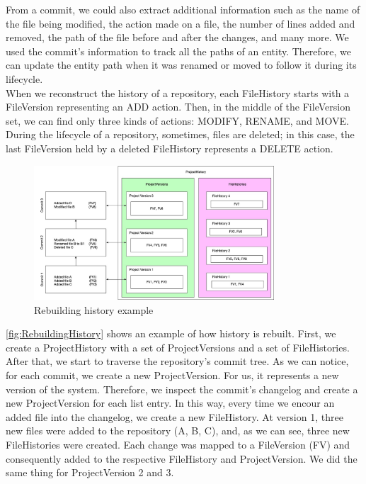 From a commit, we could also extract additional information such as the name of the file being modified, the action made on a file, the number of lines added and removed, the path of the file before and after the changes, and many more.
We used the commit's information to track all the paths of an entity. Therefore, we can update the entity path when it was renamed or moved to follow it during its lifecycle. \\
When we reconstruct the history of a repository, each FileHistory starts with a FileVersion representing an ADD action. Then, in the middle of the FileVersion set, we can find only three kinds of actions: MODIFY, RENAME, and MOVE. 
During the lifecycle of a repository, sometimes, files are deleted; in this case, the last FileVersion held by a deleted FileHistory represents a DELETE action.

\begin{figure}
    \begin{center}
        \includegraphics[width=0.8\textwidth]{RebuildingHistory.jpg}
    \end{center}
    \caption{Rebuilding history example}
    \label{fig:RebuildingHistory}
\end{figure}

\autoref{fig:RebuildingHistory} shows an example of how history is rebuilt.
First, we create a ProjectHistory with a set of ProjectVersions and a set of FileHistories.
After that, we start to traverse the repository's commit tree.
As we can notice, for each commit, we create a new ProjectVersion. For us, it represents a new version of the system. 
Therefore, we inspect the commit's changelog and create a new ProjectVersion for each list entry.
In this way, every time we encour an added file into the changelog, we create a new FileHistory. 
At version 1, three new files were added to the repository (A, B, C), and, as we can see, three new FileHistories were created.
Each change was mapped to a FileVersion (FV) and consequently added to the respective FileHistory and ProjectVersion. 
We did the same thing for ProjectVersion 2 and 3. 

